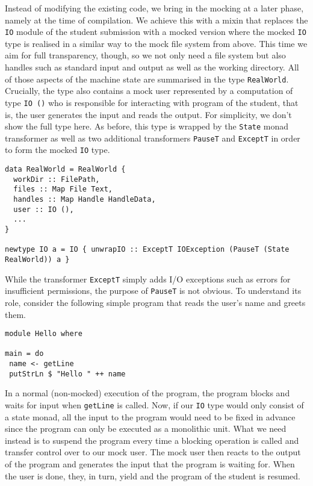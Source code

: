 Instead of modifying the existing code, we bring in the mocking at a later phase, namely at the time of compilation.
We achieve this with a mixin that replaces the \texttt{IO} module of the student submission with a mocked version where the mocked \texttt{IO} type is realised in a similar way to the mock file system from above.
This time we aim for full transparency, though, so we not only need a file system but also handles such as standard input and output as well as the working directory.
All of those aspects of the machine state are summarised in the type \texttt{RealWorld}.
Crucially, the type also contains a mock user represented by a computation of type \texttt{IO ()} who is responsible for interacting with program of the student, that is, the user generates the input and reads the output.
For simplicity, we don't show the full type here.
As before, this type is wrapped by the \texttt{State} monad transformer as well as two additional transformers \texttt{PauseT} and \texttt{ExceptT} in order to form the mocked \texttt{IO} type.
\begin{verbatim}
data RealWorld = RealWorld {
  workDir :: FilePath,
  files :: Map File Text,
  handles :: Map Handle HandleData,
  user :: IO (),
  ...
}

newtype IO a = IO { unwrapIO :: ExceptT IOException (PauseT (State RealWorld)) a } 
\end{verbatim}
While the transformer \texttt{ExceptT} simply adds I/O exceptions such as errors for insufficient permissions, the purpose of \texttt{PauseT} is not obvious.
To understand its role, consider the following simple program that reads the user's name and greets them.
\begin{verbatim}
module Hello where

main = do
 name <- getLine
 putStrLn $ "Hello " ++ name
\end{verbatim}
In a normal (non-mocked) execution of the program, the program blocks and waits for input when \texttt{getLine} is called.
Now, if our \texttt{IO} type would only consist of a state monad, all the input to the program would need to be fixed in advance since the program can only be executed as a monolithic unit.
What we need instead is to suspend the program every time a blocking operation is called and transfer control over to our mock user.
The mock user then reacts to the output of the program and generates the input that the program is waiting for.
When the user is done, they, in turn, yield and the program of the student is resumed.

